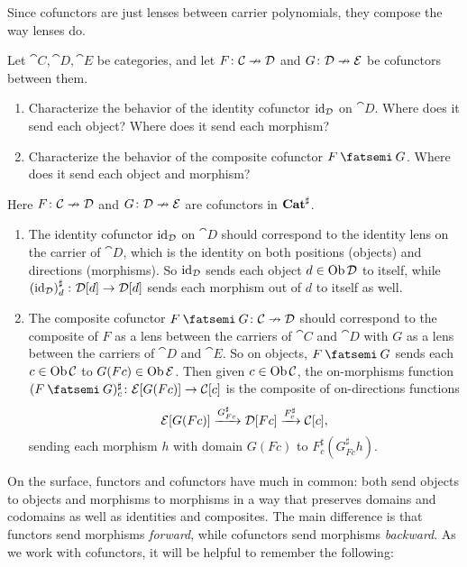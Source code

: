 \documentclass[Book-Poly]{subfiles}
\begin{document}
Since cofunctors are just lenses between carrier polynomials, they compose the way lenses do.

\begin{exercise}
Let $\cat{C},\cat{D},\cat{E}$ be categories, and let $F\colon\mathcal{C}\nrightarrow\mathcal{D}$ and $G\colon\mathcal{D}\nrightarrow\mathcal{E}$ be cofunctors between them.
\begin{enumerate}
    \item Characterize the behavior of the identity cofunctor $\mathrm{id}_{\mathcal{D}}$ on $\cat{D}$.
    Where does it send each object?
    Where does it send each morphism?
    \item Characterize the behavior of the composite cofunctor $F\then G$.
    Where does it send each object and morphism?\qedhere
\end{enumerate}
\begin{solution}
Here $F\colon\mathcal{C}\nrightarrow\mathcal{D}$ and $G\colon\mathcal{D}\nrightarrow\mathcal{E}$ are cofunctors in $\mathbf{Cat}^\sharp$.
\begin{enumerate}
    \item The identity cofunctor $\mathrm{id}_{\mathcal{D}}$ on $\cat{D}$ should correspond to the identity lens on the carrier of $\cat{D}$, which is the identity on both positions (objects) and directions (morphisms).
    So $\mathrm{id}_{\mathcal{D}}$ sends each object $d\in\operatorname{Ob}\mathcal{D}$ to itself, while $\left(\mathrm{id}_{\mathcal{D}}\right)^\sharp_d\colon\mathcal{D}[d]\to\mathcal{D}[d]$ sends each morphism out of $d$ to itself as well.
    \item The composite cofunctor $F\then G\colon\cat{C}\cof\cat{D}$ should correspond to the composite of $F$ as a lens between the carriers of $\cat{C}$ and $\cat{D}$ with $G$ as a lens between the carriers of $\cat{D}$ and $\cat{E}$.
    So on objects, $F\then G$ sends each $c\in\operatorname{Ob}\mathcal{C}$ to $G(Fc)\in\operatorname{Ob}\mathcal{E}$.
    Then given $c\in\operatorname{Ob}\mathcal{C}$, the on-morphisms function $(F\then G)^\sharp_c\colon\cat{E}[G(Fc)]\to\cat{C}[c]$ is the composite of on-directions functions
    \[
        \mathcal{E}[G(Fc)]\xrightarrow{G^\sharp_{Fc}}\mathcal{D}[Fc]\xrightarrow{F^\sharp_c}\mathcal{C}[c],
    \]
    sending each morphism $h$ with domain $G(Fc)$ to $F^\sharp_c\left(G^\sharp_{Fc}h\right)$.
\end{enumerate}
\end{solution}
\end{exercise}

On the surface, functors and cofunctors have much in common: both send objects to objects and morphisms to morphisms in a way that preserves domains and codomains as well as identities and composites.
The main difference is that functors send morphisms \emph{forward}, while cofunctors send morphisms \emph{backward}.
As we work with cofunctors, it will be helpful to remember the following:
\end{document}
